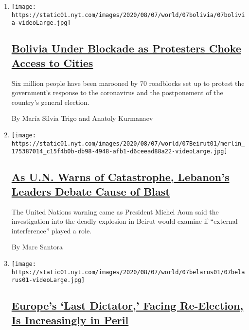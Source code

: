 \begin{enumerate}
\def\labelenumi{\arabic{enumi}.}
\item
  \texttt{[image: https://static01.nyt.com/images/2020/08/07/world/07bolivia/07bolivia-videoLarge.jpg]}

  \hypertarget{bolivia-under-blockade-as-protesters-choke-access-to-cities}{%
  \subsection{\texorpdfstring{\href{/2020/08/07/world/americas/bolivia-roadblock-blockade.html}{Bolivia
  Under Blockade as Protesters Choke Access to
  Cities}}{Bolivia Under Blockade as Protesters Choke Access to Cities}}\label{bolivia-under-blockade-as-protesters-choke-access-to-cities}}

  Six million people have been marooned by 70 roadblocks set up to
  protest the government's response to the coronavirus and the
  postponement of the country's general election.

  By María Silvia Trigo and Anatoly Kurmanaev
\item
  \texttt{[image: https://static01.nyt.com/images/2020/08/07/world/07Beirut01/merlin\_175387014\_c15f4b0b-db98-4948-afb1-d6ceead88a22-videoLarge.jpg]}

  \hypertarget{as-un-warns-of-catastrophe-lebanons-leaders-debate-cause-of-blast}{%
  \subsection{\texorpdfstring{\href{/2020/08/07/world/europe/lebanon-catastrophe-explosion-external-interference.html}{As
  U.N. Warns of Catastrophe, Lebanon's Leaders Debate Cause of
  Blast}}{As U.N. Warns of Catastrophe, Lebanon's Leaders Debate Cause of Blast}}\label{as-un-warns-of-catastrophe-lebanons-leaders-debate-cause-of-blast}}

  The United Nations warning came as President Michel Aoun said the
  investigation into the deadly explosion in Beirut would examine if
  ``external interference'' played a role.

  By Marc Santora
\item
  \texttt{[image: https://static01.nyt.com/images/2020/08/07/world/07belarus01/07belarus01-videoLarge.jpg]}

  \hypertarget{europes-last-dictator-facing-re-election-is-increasingly-in-peril}{%
  \subsection{\texorpdfstring{\href{/2020/08/07/world/europe/belarus-election-aleksandr-lukashenko.html}{Europe's
  `Last Dictator,' Facing Re-Election, Is Increasingly in
  Peril}}{Europe's `Last Dictator,' Facing Re-Election, Is Increasingly in Peril}}\label{europes-last-dictator-facing-re-election-is-increasingly-in-peril}}


\end{enumerate}
